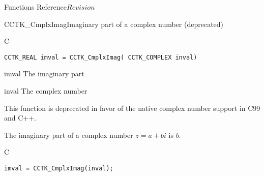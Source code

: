 \begin{cactuspart}{ Functions Reference}{}{$Revision$}
\begin{FunctionDescription}{CCTK\_CmplxImag}{Imaginary part of a complex number (deprecated)}
\label{CCTK-CmplxImag}
\begin{SynopsisSection}
\begin{Synopsis}{C}
\begin{verbatim}CCTK_REAL imval = CCTK_CmplxImag( CCTK_COMPLEX inval)\end{verbatim}
\end{Synopsis}
\end{SynopsisSection}
\begin{ParameterSection}
\begin{Parameter}{imval}
The imaginary part
\end{Parameter}
\begin{Parameter}{inval}
The complex number
\end{Parameter}
\end{ParameterSection}
\begin{Discussion}
This function is deprecated in favor of the native complex number support in
C99 and C++.

The imaginary part of a complex number $z=a+bi$ is $b$.
\end{Discussion}
\begin{ExampleSection}
\begin{Example}{C}
\begin{verbatim}
imval = CCTK_CmplxImag(inval);
\end{verbatim}
\end{Example}
\end{ExampleSection}
\end{FunctionDescription}


\end{cactuspart}
